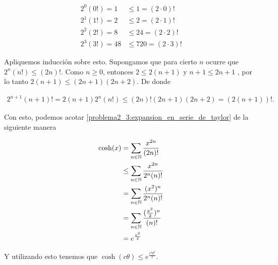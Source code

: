 \begin{align}
    2^0(0!) = 1     &\leq  1     = (2 \cdot 0)!      \\
    2^1(1!) = 2     &\leq  2     = (2 \cdot 1)!      \\
    2^2(2!) = 8     &\leq  24    = (2 \cdot 2)!      \\
    2^3(3!) = 48    &\leq 720    = (2 \cdot 3)!      
\end{align}\par\null

Apliquemos inducción sobre esto. Supongamos que para cierto $n$ ocurre que $2^n(n!) \leq (2n)!$. Como $n \geq 0$, 
entonces $2 \leq 2(n + 1)$ y $n + 1\leq 2n+1$ , por lo tanto $2 (n+1) \leq (2n+1) (2n + 2)$. 
De donde 

\begin{align}
    2^{n+1}(n+1)! = 2(n+1) 2^n(n!) \leq (2n)! (2n+1)(2n+2) = (2(n+1))!.
\end{align}\par\null

Con esto, podemos acotar \eqref{problema2_3:expansion_en_serie_de_taylor} de la siguiente manera

\begin{align}
    \cosh(x)    &=      \sum_{n \in \mathbb{N}} \frac{x^{2n}}{(2n)!}            \\
                &\leq   \sum_{n \in \mathbb{N}} \frac{x^{2n}}{2^n(n)!}          \\
                &=   \sum_{n \in \mathbb{N}} \frac{(x^2)^{n}}{2^n(n)!}          \\
                &=   \sum_{n \in \mathbb{N}} \frac{(\frac{x^2}{2})^{n}}{(n)!}   \\   
                &=   e^{\frac{x^2}{2}}   
\end{align}

Y utilizando esto tenemos que $\cosh(c \theta) \leq e^{\frac{c^2 \theta^2}{2}}$.


